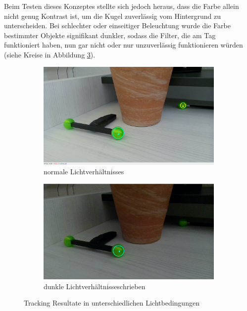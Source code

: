 \documentclass[12pt, ngerman]{article}
\begin{document}
Beim Testen dieses Konzeptes stellte sich jedoch heraus, dass die Farbe allein nicht genug Kontrast ist, um die Kugel zuverlässig vom Hintergrund zu unterscheiden. Bei schlechter oder einseitiger Beleuchtung wurde die Farbe bestimmter Objekte signifikant dunkler, sodass die Filter, die am Tag funktioniert haben, nun gar nicht oder nur unzuverlässig funktionieren würden (siehe Kreise in Abbildung \ref{Abb: Lichtbedingungen}).  

\begin{figure}[htbp!]
  \centering
  \begin{subfigure}[t]{0.45\textwidth}
      \centering
      \includegraphics[width=\textwidth]{2d-normal.jpg}
      \caption{normale Lichtverhältnisses}
      \label{Abb: 2d-normal}
  \end{subfigure}
  \hfill
  \begin{subfigure}[t]{0.45\textwidth}
      \centering
      \includegraphics[width=\textwidth]{2d-normal-dark.jpg}
      \caption{dunkle Lichtverhältnisseschrieben}
      \label{Abb: 2d-normal-dunkel}
  \end{subfigure}
  \caption{Tracking Resultate in unterschiedlichen Lichtbedingungen}
  \label{Abb: Lichtbedingungen}
\end{figure}
\end{document}
